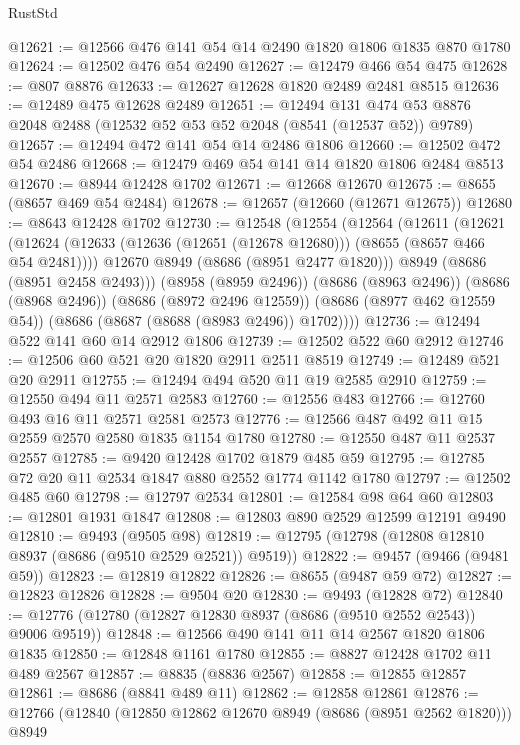 \begin{lexlean}{RustStd}
\begin{coremodule}
@12621 := @12566 @476 @141 @54 @14 @2490 @1820 @1806 @1835 @870 @1780
@12624 := @12502 @476 @54 @2490
@12627 := @12479 @466 @54 @475
@12628 := @807 @8876
@12633 := @12627 @12628 @1820 @2489 @2481 @8515
@12636 := @12489 @475 @12628 @2489
@12651 := @12494
    @131
    @474
    @53
    @8876
    @2048
    @2488
    (@12532 @52 @53 @52 @2048 (@8541 (@12537 @52)) @9789)
@12657 := @12494 @472 @141 @54 @14 @2486 @1806
@12660 := @12502 @472 @54 @2486
@12668 := @12479 @469 @54 @141 @14 @1820 @1806 @2484 @8513
@12670 := @8944 @12428 @1702
@12671 := @12668 @12670
@12675 := @8655 (@8657 @469 @54 @2484)
@12678 := @12657 (@12660 (@12671 @12675))
@12680 := @8643 @12428 @1702
@12730 := @12548
    (@12554
      (@12564
        (@12611
          (@12621
            (@12624 (@12633 (@12636 (@12651 (@12678 @12680))) (@8655 (@8657 @466 @54 @2481))))
            @12670
            @8949
            (@8686 (@8951 @2477 @1820)))
          @8949
          (@8686 (@8951 @2458 @2493)))
        (@8958 (@8959 @2496))
        (@8686 (@8963 @2496))
        (@8686 (@8968 @2496))
        (@8686 (@8972 @2496 @12559))
        (@8686 (@8977 @462 @12559 @54))
        (@8686 (@8687 (@8688 (@8983 @2496)) @1702))))
@12736 := @12494 @522 @141 @60 @14 @2912 @1806
@12739 := @12502 @522 @60 @2912
@12746 := @12506 @60 @521 @20 @1820 @2911 @2511 @8519
@12749 := @12489 @521 @20 @2911
@12755 := @12494 @494 @520 @11 @19 @2585 @2910
@12759 := @12550 @494 @11 @2571 @2583
@12760 := @12556 @483
@12766 := @12760 @493 @16 @11 @2571 @2581 @2573
@12776 := @12566 @487 @492 @11 @15 @2559 @2570 @2580 @1835 @1154 @1780
@12780 := @12550 @487 @11 @2537 @2557
@12785 := @9420 @12428 @1702 @1879 @485 @59
@12795 := @12785 @72 @20 @11 @2534 @1847 @880 @2552 @1774 @1142 @1780
@12797 := @12502 @485 @60
@12798 := @12797 @2534
@12801 := @12584 @98 @64 @60
@12803 := @12801 @1931 @1847
@12808 := @12803 @890 @2529 @12599 @12191 @9490
@12810 := @9493 (@9505 @98)
@12819 := @12795 (@12798 (@12808 @12810 @8937 (@8686 (@9510 @2529 @2521)) @9519))
@12822 := @9457 (@9466 (@9481 @59))
@12823 := @12819 @12822
@12826 := @8655 (@9487 @59 @72)
@12827 := @12823 @12826
@12828 := @9504 @20
@12830 := @9493 (@12828 @72)
@12840 := @12776 (@12780 (@12827 @12830 @8937 (@8686 (@9510 @2552 @2543)) @9006 @9519))
@12848 := @12566 @490 @141 @11 @14 @2567 @1820 @1806 @1835
@12850 := @12848 @1161 @1780
@12855 := @8827 @12428 @1702 @11 @489 @2567
@12857 := @8835 (@8836 @2567)
@12858 := @12855 @12857
@12861 := @8686 (@8841 @489 @11)
@12862 := @12858 @12861
@12876 := @12766
    (@12840
      (@12850 @12862 @12670 @8949 (@8686 (@8951 @2562 @1820)))
      @8949

\end{coremodule}
\end{lexlean}
